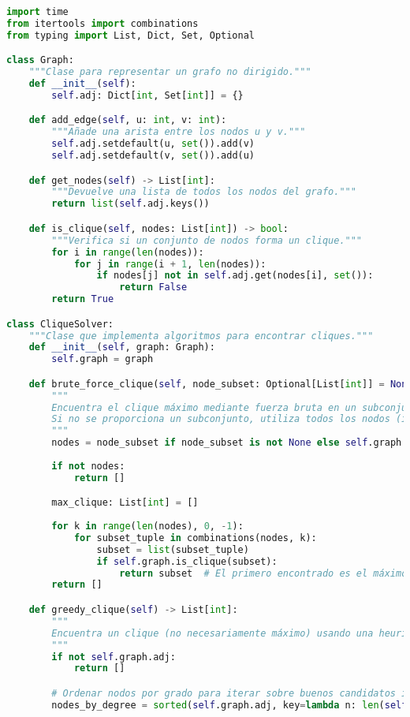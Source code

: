\documentclass[12pt,a4paper]{report}
\begin{document}
\begin{lstlisting}[language=Python,caption={Solver de cliques en Python}]
import time
from itertools import combinations
from typing import List, Dict, Set, Optional

class Graph:
    """Clase para representar un grafo no dirigido."""
    def __init__(self):
        self.adj: Dict[int, Set[int]] = {}

    def add_edge(self, u: int, v: int):
        """Añade una arista entre los nodos u y v."""
        self.adj.setdefault(u, set()).add(v)
        self.adj.setdefault(v, set()).add(u)

    def get_nodes(self) -> List[int]:
        """Devuelve una lista de todos los nodos del grafo."""
        return list(self.adj.keys())

    def is_clique(self, nodes: List[int]) -> bool:
        """Verifica si un conjunto de nodos forma un clique."""
        for i in range(len(nodes)):
            for j in range(i + 1, len(nodes)):
                if nodes[j] not in self.adj.get(nodes[i], set()):
                    return False
        return True

class CliqueSolver:
    """Clase que implementa algoritmos para encontrar cliques."""
    def __init__(self, graph: Graph):
        self.graph = graph

    def brute_force_clique(self, node_subset: Optional[List[int]] = None) -> List[int]:
        """
        Encuentra el clique máximo mediante fuerza bruta en un subconjunto de nodos.
        Si no se proporciona un subconjunto, utiliza todos los nodos (inviable para grafos grandes).
        """
        nodes = node_subset if node_subset is not None else self.graph.get_nodes()
        
        if not nodes:
            return []

        max_clique: List[int] = []
        
        for k in range(len(nodes), 0, -1):
            for subset_tuple in combinations(nodes, k):
                subset = list(subset_tuple)
                if self.graph.is_clique(subset):
                    return subset  # El primero encontrado es el máximo
        return []

    def greedy_clique(self) -> List[int]:
        """
        Encuentra un clique (no necesariamente máximo) usando una heurística greedy.
        """
        if not self.graph.adj:
            return []

        # Ordenar nodos por grado para iterar sobre buenos candidatos iniciales
        nodes_by_degree = sorted(self.graph.adj, key=lambda n: len(self.graph.adj[n]), reverse=True)
        

\end{lstlisting}
\end{document}
